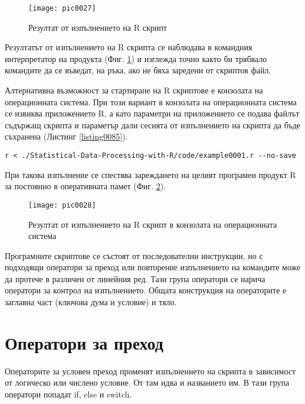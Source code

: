 \begin{figure}[h!]
  \centering
  \texttt{[image: pic0027]}
  \caption{Резултат от изпълнението на R скрипт}
\label{figure0027}
\end{figure}
\FloatBarrier

Резултатът от изпълнението на R скрипта се наблюдава в командния интерпретатор на продукта (Фиг. \ref{figure0027}) и изглежда точно както би трябвало командите да се въведат, на ръка, ако не бяха заредени от скриптов файл.

Алтернативна възможност за стартиране на R скриптове е конзолата на операционната система. При този вариант в конзолата на операционната система се извиква приложението R, а като параметри на приложението се подава файлът съдържащ скрипта и параметър дали сесията от изпълнението на скрипта да бъде съхранена (Листинг \ref{listing0085}).

\begin{lstlisting}[caption=Изпълнение на R скрипт от конзолата на операционната система, label=listing0085]
r < ./Statistical-Data-Processing-with-R/code/example0001.r --no-save
\end{lstlisting}

При такова изпълнение се спестява зареждането на целият програмен продукт R за постоянно в оперативната памет (Фиг. \ref{figure0028}).

\begin{figure}[h!]
  \centering
  \texttt{[image: pic0028]}
  \caption{Резултат от изпълнението на R скрипт в конзолата на операционната система}
\label{figure0028}
\end{figure}
\FloatBarrier

Програмните скриптове се състоят от последователни инструкции, но с подходящи оператори за преход или повторение изпълнението на командите може да протече в различен от линейния ред. Тази група оператори се нарича оператори за контрол на изпълнението. Общата конструкция на операторите е заглавна част (ключова дума и условие) и тяло. 

\section{Оператори за преход}

Операторите за условен преход променят изпълнението на скрипта в зависимост от логическо или числено условие. От там идва и названието им. В тази група оператори попадат if, else и switch.

